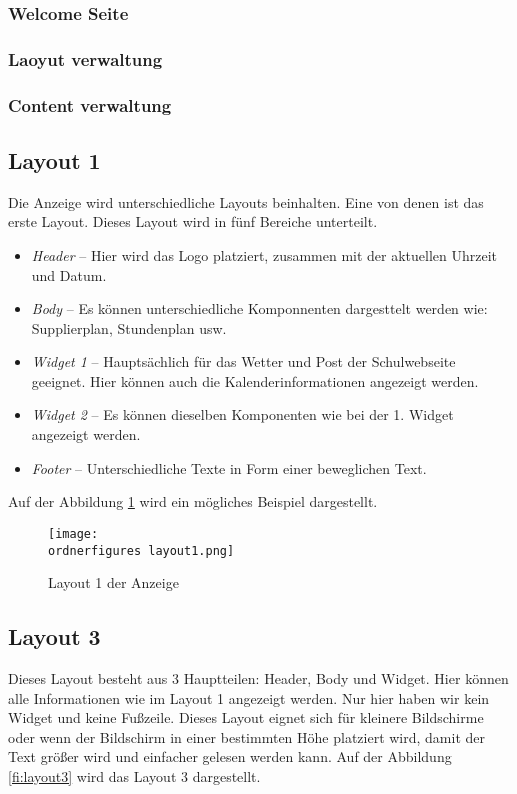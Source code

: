 \subsubsection{Welcome Seite}
\subsubsection{Laoyut verwaltung}
\subsubsection{Content verwaltung}

\subsection{Layout 1}
Die Anzeige wird unterschiedliche Layouts beinhalten. Eine von denen ist das erste Layout. Dieses Layout wird in fünf Bereiche unterteilt.

\begin{itemize}
	\item \textit{Header} – Hier wird das Logo platziert, zusammen mit der aktuellen Uhrzeit und Datum.
	\item \textit{Body} – Es können unterschiedliche Komponnenten dargesttelt werden wie: Supplierplan, Stundenplan usw.
	\item \textit{Widget 1} – Hauptsächlich für das Wetter und Post der Schulwebseite geeignet. Hier können auch die Kalenderinformationen angezeigt werden.
	\item \textit{Widget 2} – Es können dieselben Komponenten wie bei der 1. Widget angezeigt werden.
	\item \textit{Footer} – Unterschiedliche Texte in Form einer beweglichen Text.
	
\end{itemize}

Auf der Abbildung \ref{fi:layout1} wird ein mögliches Beispiel dargestellt.

\begin{figure}[H]
	\centering
	\texttt{[image: \\ordnerfigures layout1.png]}
	\caption{Layout 1 der Anzeige}
	\label{fi:layout1}
\end{figure}

\subsection{Layout 3}
Dieses Layout besteht aus 3 Hauptteilen: Header, Body und Widget. Hier können alle Informationen wie im Layout 1 angezeigt werden. Nur hier haben wir kein Widget und keine Fußzeile. Dieses Layout eignet sich für kleinere Bildschirme oder wenn der Bildschirm in einer bestimmten Höhe platziert wird, damit der Text größer wird und einfacher gelesen werden kann. Auf der Abbildung \ref{fi:layout3} wird das Layout 3 dargestellt.


